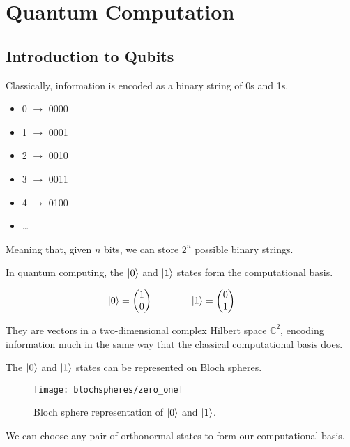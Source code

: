 \section{Quantum Computation}

\subsection{Introduction to Qubits}

Classically, information is encoded as a binary string of 0s and 1s.

\begin{itemize}
    \itemsep 2pt
    \item 0 $\rightarrow$ 0000
    \item 1 $\rightarrow$ 0001
    \item 2 $\rightarrow$ 0010
    \item 3 $\rightarrow$ 0011
    \item 4 $\rightarrow$ 0100
    \item \dots
\end{itemize}

Meaning that, given $n$ bits, we can store $2^n$ possible binary strings.

In quantum computing, the $\ket 0$ and $\ket 1$ states form the computational basis.

\begin{equation*}
    \ket 0 = \begin{pmatrix} 1 \\ 0 \end{pmatrix} \qquad\qquad
    \ket 1 = \begin{pmatrix} 0 \\ 1 \end{pmatrix} \qquad
\end{equation*}

They are vectors in a two-dimensional complex Hilbert space $\mathbb{C}^2$, encoding information much in the same way that the classical computational basis does.

The $\ket 0$ and $\ket 1$ states can be represented on Bloch spheres.

\begin{figure}[H]
\centering
    \texttt{[image: blochspheres/zero\_one]}
    \caption{Bloch sphere representation of $\ket 0$ and $\ket 1$.}
\end{figure}

We can choose any pair of orthonormal states to form our computational basis.

